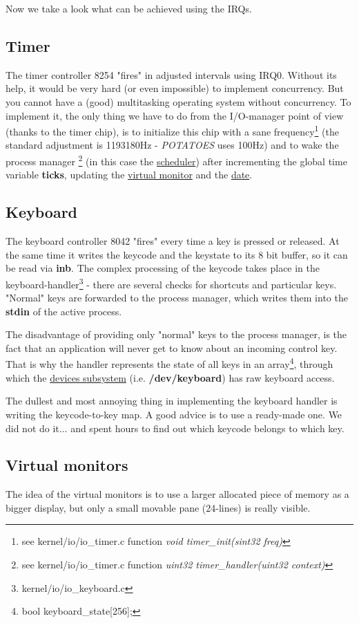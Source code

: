 \documentclass[11pt,a4paper]{scrartcl}
\begin{document}
Now we take a look what can be achieved using the IRQs.
\subsection{Timer}
\hypertarget{TIMER}{}
The timer controller 8254 "fires" in adjusted intervals using IRQ0. Without its help, it would be very hard (or even impossible) to implement concurrency. But you cannot have a (good) multitasking operating system without concurrency. To implement it, the only thing we have to do from the I/O-manager point of view (thanks to the timer chip), is to initialize this chip with a sane frequency\footnote{see {kernel/io/io\_timer.c} function \textit{void timer\_init(sint32 freq)}} (the standard adjustment is 1193180Hz - \textit{POTATOES} uses 100Hz) and to wake the process manager \footnote{see {kernel/io/io\_timer.c} function \textit{uint32 timer\_handler(uint32 context)}} (in this case the \hyperlink{SCHEDULER}{scheduler}) after incrementing the global time variable \textbf{ticks}, updating the \hyperlink{VMONITOR}{virtual monitor} and the \hyperlink{RTC}{date}.

\subsection{Keyboard}
\hypertarget{KEYBOARD}{}
The keyboard controller 8042 "fires" every time a key is pressed or released. At the same time it writes the keycode and the keystate to its 8 bit buffer, so it can be read via \textbf{inb}. The complex processing of the keycode takes place in the keyboard-handler\footnote{kernel/io/io\_keyboard.c} - there are several checks for shortcuts and particular keys. "Normal" keys are forwarded to the process manager, which writes them into the \textbf{stdin} of the active process.

The disadvantage of providing only "normal" keys to the process manager, is the fact that an application will never get to know about an incoming control key. That is why the handler represents the state of all keys in an array\footnote{bool keyboard\_state[256];}, through which the \hyperlink{DEVICES}{devices subsystem} (i.e. \textbf{/dev/keyboard}) has raw keyboard access.

The dullest and most annoying thing in implementing the keyboard handler is writing the keycode-to-key map. A good advice is to use a ready-made one. We did not do it... and spent hours to find out which keycode belongs to which key.
\subsection{Virtual monitors}
\hypertarget{VMONITOR}{}
The idea of the virtual monitors is to use a larger allocated piece of memory as a bigger display, but only a small movable pane (24-lines) is really visible.
\end{document}
